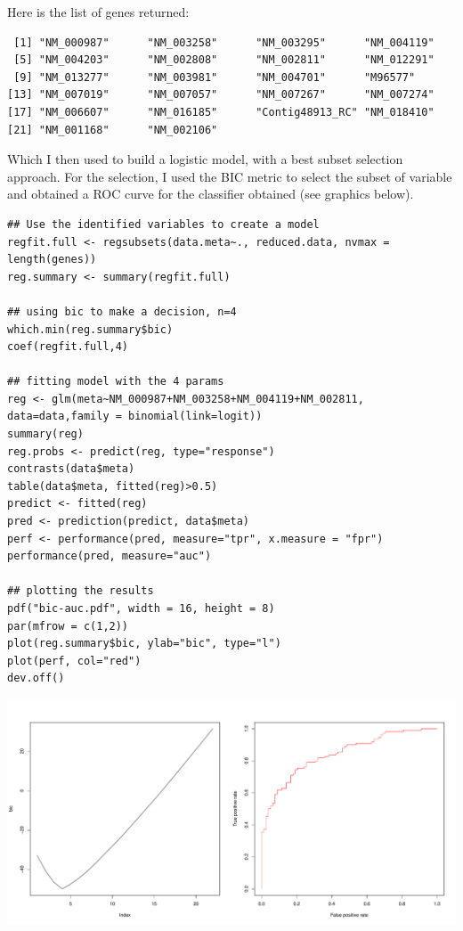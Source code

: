 \documentclass[11pt, a4paper]{article}
\begin{document}
Here is the list of genes returned:


\begin{verbatim}
 [1] "NM_000987"      "NM_003258"      "NM_003295"      "NM_004119"     
 [5] "NM_004203"      "NM_002808"      "NM_002811"      "NM_012291"     
 [9] "NM_013277"      "NM_003981"      "NM_004701"      "M96577"        
[13] "NM_007019"      "NM_007057"      "NM_007267"      "NM_007274"     
[17] "NM_006607"      "NM_016185"      "Contig48913_RC" "NM_018410"     
[21] "NM_001168"      "NM_002106"
\end{verbatim}

Which I then used to build a logistic model, with a best subset
selection approach. For the selection, I used the BIC metric to
select the subset of variable and obtained a ROC curve for the
classifier obtained (see graphics below).


\begin{verbatim}
## Use the identified variables to create a model
regfit.full <- regsubsets(data.meta~., reduced.data, nvmax = length(genes))
reg.summary <- summary(regfit.full)

## using bic to make a decision, n=4
which.min(reg.summary$bic)
coef(regfit.full,4)

## fitting model with the 4 params
reg <- glm(meta~NM_000987+NM_003258+NM_004119+NM_002811, data=data,family = binomial(link=logit))
summary(reg)
reg.probs <- predict(reg, type="response")
contrasts(data$meta)
table(data$meta, fitted(reg)>0.5)
predict <- fitted(reg)
pred <- prediction(predict, data$meta)
perf <- performance(pred, measure="tpr", x.measure = "fpr")
performance(pred, measure="auc")

## plotting the results
pdf("bic-auc.pdf", width = 16, height = 8)
par(mfrow = c(1,2))
plot(reg.summary$bic, ylab="bic", type="l")
plot(perf, col="red")
dev.off()
\end{verbatim}

\includegraphics[scale=0.4]{bic-auc.pdf}
\end{document}
